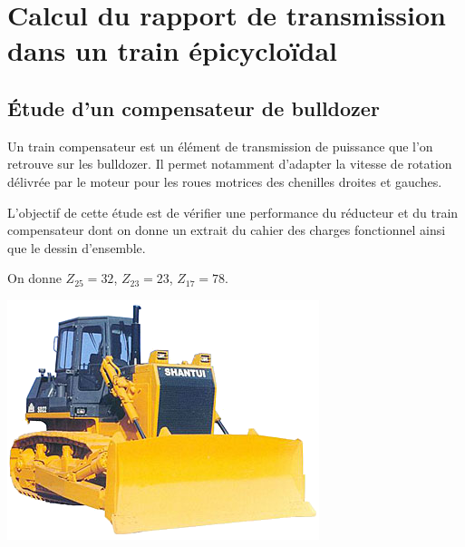 \documentclass[10pt,oneside]{article}
\begin{document}

\section{Calcul du rapport de transmission dans un train épicycloïdal}
\subsection{Étude d'un compensateur de bulldozer}
\begin{exemple}
\begin{minipage}[c]{.55\linewidth}

Un train compensateur est un élément de transmission de puissance que l'on retrouve sur les bulldozer. Il permet notamment d'adapter la vitesse de rotation délivrée par le moteur pour les roues motrices des chenilles droites et gauches.

L'objectif de cette étude est de vérifier une performance du réducteur et du train compensateur dont on donne un extrait du cahier des charges fonctionnel ainsi que le dessin d'ensemble. 

On donne $Z_{25}=32$, $Z_{23}=23$, $Z_{17}=78$.
\end{minipage}\hfill
\begin{minipage}[c]{.4\linewidth}
\begin{center}
\includegraphics[width=.9\textwidth]{png/fig7}
\end{center}
\end{minipage}
\end{exemple}
\end{document}
